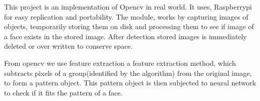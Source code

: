 This project is an implementation of Opencv in real world. It uses, Raspberrypi for easy replication and portability. The module, works
by capturing images of objects, temporarily storing them on disk and processing them to see if image of a face exists in
the stored image. After detection stored images is immediately deleted or over written to conserve space. 

From opencv we use feature extraction a feature extraction method, which subtracts pixels of a group(identified by the algorithm) from
the original image, to form a pattern object. This pattern object is then subjected to neural network to check if it fits the pattern of a face.

